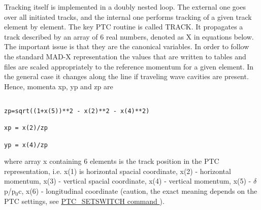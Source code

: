 Tracking itself is implemented in a doubly nested loop.  The external one goes over all initiated tracks,  and the internal one performs tracking of a given track element by element. The key PTC routine is called TRACK. It propagates a track described by an array of 6 real numbers, denoted as X in equations below. The important issue is that they are the canonical variables. In order to follow the standard MAD-X representation the values that are written to tables and files are scaled appropriately to the reference momentum for a given element. In the general case it changes along the line if traveling wave cavities are present. Hence, momenta xp, yp and zp are 
\begin{verbatim}
     
zp=sqrt((1+x(5))**2 - x(2)**2 - x(4)**2) 
     
xp = x(2)/zp
     
yp = x(4)/zp
\end{verbatim}  where array x containing 6 elements is the track position in the PTC representation, i.e. x(1) is horizontal spacial coordinate, x(2) - horizontal momentum, x(3) - vertical spacial coordinate, x(4) - vertical momentum, x(5) - $\delta$p/p$_0$c, x(6) - longitudinal coordinate  (caution, the exact meaning depends on the PTC settings, see \href{../ptc_auxiliaries/PTC_SetSwitch.html}{ PTC\_SETSWITCH command }).  

